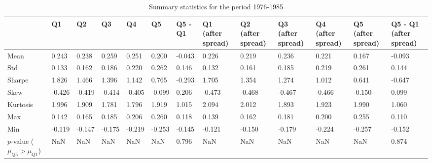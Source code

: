 \begin{table}
\caption{Summary statistics for the period 1976-1985}
\label{tab:summary_1976_1985}
\begin{tabular}{lllllllllllll}
\toprule
 & Q1 & Q2 & Q3 & Q4 & Q5 & Q5 - Q1 & Q1 (after spread) & Q2 (after spread) & Q3 (after spread) & Q4 (after spread) & Q5 (after spread) & Q5 - Q1 (after spread) \\
\midrule
Mean & 0.243 & 0.238 & 0.259 & 0.251 & 0.200 & -0.043 & 0.226 & 0.219 & 0.236 & 0.221 & 0.167 & -0.093 \\
Std & 0.133 & 0.162 & 0.186 & 0.220 & 0.262 & 0.146 & 0.132 & 0.161 & 0.185 & 0.219 & 0.261 & 0.144 \\
Sharpe & 1.826 & 1.466 & 1.396 & 1.142 & 0.765 & -0.293 & 1.705 & 1.354 & 1.274 & 1.012 & 0.641 & -0.647 \\
Skew & -0.426 & -0.419 & -0.414 & -0.405 & -0.099 & 0.206 & -0.473 & -0.468 & -0.467 & -0.466 & -0.150 & 0.099 \\
Kurtosis & 1.996 & 1.909 & 1.781 & 1.796 & 1.919 & 1.015 & 2.094 & 2.012 & 1.893 & 1.923 & 1.990 & 1.060 \\
Max & 0.142 & 0.165 & 0.185 & 0.206 & 0.260 & 0.118 & 0.139 & 0.162 & 0.181 & 0.200 & 0.255 & 0.110 \\
Min & -0.119 & -0.147 & -0.175 & -0.219 & -0.253 & -0.145 & -0.121 & -0.150 & -0.179 & -0.224 & -0.257 & -0.152 \\
$p$-value ($\mu_{Q5} > \mu_{Q1}$) & NaN & NaN & NaN & NaN & NaN & 0.796 & NaN & NaN & NaN & NaN & NaN & 0.874 \\
\bottomrule
\end{tabular}
\end{table}
